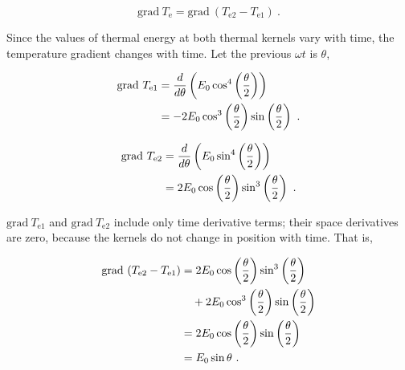 \documentclass[%
 reprint,
 amsmath,amssymb,
 aps,
]{revtex4-1}
\numberwithin{equation}{section}%
\begin{document}
    \begin{equation}
            \mathrm{grad} \ T_{\mathrm{e}} = \mathrm{grad} \ ( T_{\mathrm{e2}} - T_{\mathrm{e1}} )
            \ .
            \label{e3_k_grad_Te2-Te1}
    \end{equation}

    Since the values of thermal energy at both thermal kernels vary with time, the temperature gradient changes with time. Let the previous $\omega t$ is $\theta$,

        \begin{align}
            \mathrm{grad} \ T_{\mathrm{e1}}
                &= \frac{d}{d \theta} \left( E_{0} \cos^{4} \left( \frac{\theta}{2} \right) \right) \notag \\
                &= - 2 E_{0} \cos^{3} \left( \frac{\theta}{2} \right) \sin \left( \frac{\theta}{2} \right)
                \ .
                \label{e3_gradT_e1}
        \end{align}

        \begin{align}
            \mathrm{grad} \ T_{\mathrm{e2}}
                &= \frac{d}{d \theta} \left( E_{0} \sin^{4} \left( \frac{\theta}{2} \right) \right) \notag \\
                &=   2 E_{0} \cos \left( \frac{\theta}{2} \right) \sin^{3} \left( \frac{\theta}{2} \right)
                \ .
                \label{e3_gradT_e2}
        \end{align}        
 

    $\mathrm{grad} \ T_{\mathrm{e1}}$ and $\mathrm{grad} \ T_{\mathrm{e2}}$ include only time derivative terms; their space derivatives are zero, because the kernels do not change in position with time. That is,

        \begin{align}
            \mathrm{grad} \ (T_{\mathrm{e2}} - T_{\mathrm{e1}})
                &= 2 E_{0} \cos \left( \frac{\theta}{2} \right) \sin^{3} \left( \frac{\theta}{2} \right) \notag \\
                & \quad + 2 E_{0} \cos^{3} \left( \frac{\theta}{2} \right) \sin \left( \frac{\theta}{2} \right) \notag \\
                &= 2 E_{0} \cos \left( \frac{\theta}{2} \right) \sin \left( \frac{\theta}{2} \right) \notag \\
                &= E_{0} \sin \theta
                \ .
            \label{e3_simple_harmonic_motion}
        \end{align}
\end{document}
